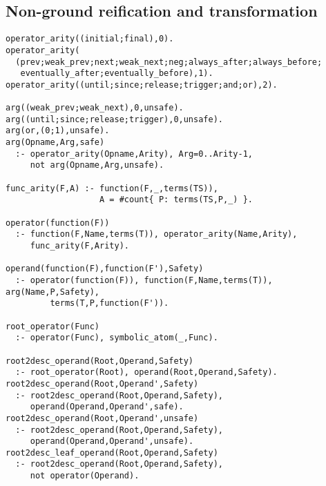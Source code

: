 \subsection{Non-ground reification and transformation}


\begin{center}
\begin{minipage}{\linewidth}
  \begin{lstlisting}[]
operator_arity((initial;final),0).
operator_arity(
  (prev;weak_prev;next;weak_next;neg;always_after;always_before;
   eventually_after;eventually_before),1).
operator_arity((until;since;release;trigger;and;or),2).

arg((weak_prev;weak_next),0,unsafe).
arg((until;since;release;trigger),0,unsafe).
arg(or,(0;1),unsafe).
arg(Opname,Arg,safe)
  :- operator_arity(Opname,Arity), Arg=0..Arity-1, 
     not arg(Opname,Arg,unsafe).

func_arity(F,A) :- function(F,_,terms(TS)), 
                   A = #count{ P: terms(TS,P,_) }.

operator(function(F))
  :- function(F,Name,terms(T)), operator_arity(Name,Arity), 
     func_arity(F,Arity).

operand(function(F),function(F'),Safety)
  :- operator(function(F)), function(F,Name,terms(T)), arg(Name,P,Safety),
		 terms(T,P,function(F')).

root_operator(Func)
  :- operator(Func), symbolic_atom(_,Func).

root2desc_operand(Root,Operand,Safety)
  :- root_operator(Root), operand(Root,Operand,Safety).
root2desc_operand(Root,Operand',Safety)
  :- root2desc_operand(Root,Operand,Safety), 
     operand(Operand,Operand',safe).
root2desc_operand(Root,Operand',unsafe)
  :- root2desc_operand(Root,Operand,Safety), 
     operand(Operand,Operand',unsafe).
root2desc_leaf_operand(Root,Operand,Safety)
  :- root2desc_operand(Root,Operand,Safety), 
     not operator(Operand).

\end{lstlisting}
\end{minipage}
\end{center}


